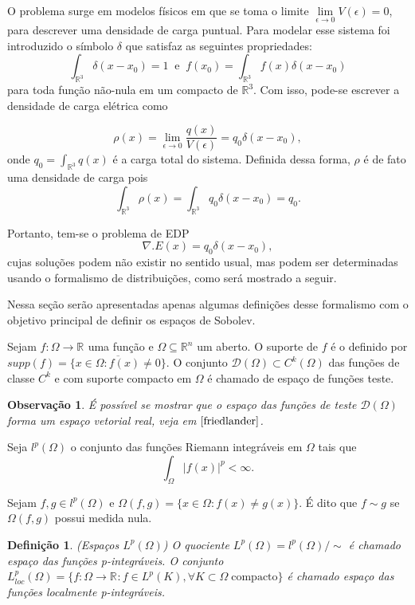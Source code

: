 \documentclass[12pt]{book}
\newtheorem{definicao}[teorema]{Definição}
\newtheorem{observacao}[teorema]{Observação}
\newcommand{\espacoLp}[1]{L^{p}(#1)}
\newcommand{\espacoLpcomp}[1]{L^{p}_{loc}(#1)}
\newcommand{\espacoLpGeral}[2]{L^{#1}(#2)}
\newcommand{\funcoesdiferenciaveis}[2]{C^{#1}(#2)}
\newcommand{\funcoesteste}{\funcoestestegeral{\Omega}}
\newcommand{\funcoestestegeral}[1]{\mathcal{D}(#1)}
\newcommand{\real}[1]{\mathbb{R}^{#1}}
\newcommand{\reta}{\real{}}
\begin{document}
	O problema surge em modelos físicos em que se toma o limite $\lim\limits_{\epsilon\to 0}V(\epsilon)=0$, para descrever uma densidade de carga puntual. Para modelar esse sistema foi introduzido o símbolo $\delta$ que satisfaz as seguintes propriedades:
	$$
	\int_{\real{3}}\delta(x-x_{0}) = 1\;\;\text{e}\;\; 	f(x_{0})=\int_{\real{3}}f(x)\delta(x-x_{0})
	$$
	para toda função não-nula em um compacto de $\real{3}$. Com isso, pode-se escrever a densidade de carga elétrica como
	
	$$
	\rho(x) = \lim_{\epsilon\to 0} \frac{q(x)}{V(\epsilon)} = q_{0}\delta(x - x_{0}),
	$$
	onde $q_{0} =\int_{\real{3}}q(x)$ é a carga total do sistema. Definida dessa forma, $\rho$ é de fato uma densidade de carga pois
	$$
	\int_{\real{3}}\rho(x) = \int_{\real{3}}q_{0}\delta(x-x_{0}) = q_{0}.
	$$
	
	Portanto, tem-se o problema de EDP
	$$
	\nabla.E(x) = q_{0}\delta(x-x_{0}),
	$$
	cujas soluções podem não existir no sentido usual, mas podem ser determinadas usando o formalismo de distribuições, como será mostrado a seguir.
	

	Nessa seção serão apresentadas apenas algumas definições desse formalismo com o objetivo principal de definir os espaços de Sobolev.
	
	Sejam $f:\Omega\to \reta$ uma função e $\Omega \subseteq \real{n}$ um aberto. O suporte de $f$ é o definido por $supp(f) = \overline{\{ x\in \Omega: f(x)\neq 0 \}}$. O conjunto $\funcoesteste \subset \funcoesdiferenciaveis{k}{\Omega}$ das funções de classe $C^{k}$ e com suporte compacto em $\Omega$ é chamado de espaço de funções teste.
	
	\begin{observacao}
		É possível se mostrar que o espaço das funções de teste $\funcoesteste$ forma um espaço vetorial real, veja em $\cite{friedlander}$.
	\end{observacao}
	
	Seja $l^{p}(\Omega)$ o conjunto das funções Riemann integráveis em $\Omega$ tais que 
	$$
	\int_{\Omega}|f(x)|^{p} <\infty.$$ 
	
	Sejam $f,g \in l^{p}(\Omega)$ e $\Omega(f,g) = \{x\in \Omega: f(x) \neq g(x)\}$. É dito que $f \sim g$ se $\Omega(f,g)$ possui medida nula.
	
	\begin{definicao}\label{definicao_espaco_Lp}
		(Espaços $\espacoLpGeral{p}{\Omega}$) O quociente $\espacoLpGeral{p}{\Omega}=l^{p}(\Omega)/\sim$ é chamado espaço das funções p-integráveis. O conjunto $\espacoLpcomp{\Omega} = \{f:\Omega\to \reta: f \in \espacoLp{K}, \forall K \subset \Omega \;\text{compacto}\}$ é chamado espaço das funções localmente p-integráveis.
	\end{definicao}
	
\end{document}
